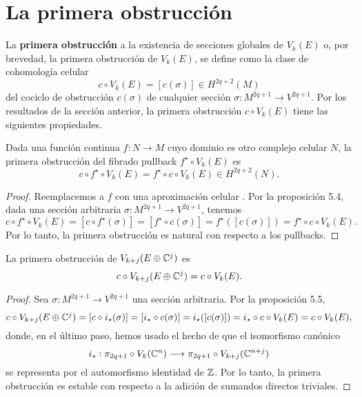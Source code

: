 \section{La primera obstrucción}

La \textbf{primera obstrucción} a la existencia de secciones globales de $V_k(E)$ o, por brevedad, la primera obstrucción de $V_k(E)$, se define como la clase de cohomología celular
$$c \circ V_k(E) = [c(\sigma)] \in H^{2q+2}(M)$$
del cociclo de obstrucción $c(\sigma)$ de cualquier sección $\sigma : M^{2q+1} \to V^{2q+1}$. Por los resultados de la sección anterior, la primera obstrucción $c \circ V_k(E)$ tiene las siguientes propiedades.

\begin{proposition}[Naturalidad]
Dada una función continua $f : N \to M$ cuyo dominio es otro complejo celular $N$, la primera obstrucción del fibrado pullback $f^\star \circ V_k(E)$ es
$$c \circ f^\star \circ V_k(E) = f^\star \circ c \circ V_k(E) \in H^{2q+2}(N).$$
\end{proposition}

\begin{proof}
Reemplacemos a $f$ con una aproximación celular \cite[p. 349]{hatcher1}. Por la proposición 5.4, dada una sección arbitraria $\sigma : M^{2q+1} \to V^{2q+1}$, tenemos
$$
c \circ f^\star \circ V_k(E)
    = [c \circ f^\star(\sigma)]
    = [f^\star \circ c(\sigma)]
    = f^\star([c(\sigma)])
    = f^\star \circ c \circ V_k(E).
$$
Por lo tanto, la primera obstrucción es natural con respecto a los pullbacks.
\end{proof}

\begin{proposition}[Estabilidad]
La primera obstrucción de $V_{k+j}(E \oplus \mathbb C^j)$ es
$$c \circ V_{k+j}(E \oplus \mathbb C^j) = c \circ V_k(E).$$
\end{proposition}

\begin{proof}
Sea $\sigma : M^{2q+1} \to V^{2q+1}$ una sección arbitraria. Por la proposición 5.5,
$$
c \circ V_{k+j}(E \oplus \mathbb C^j)
    = [c \circ i_\star(\sigma)]
    = [i_\star \circ c(\sigma)]
    = i_\star([c(\sigma)])
    = i_\star \circ c \circ V_k(E)
    = c \circ V_k(E),
$$
donde, en el último paso, hemos usado el hecho de que el isomorfismo canónico
$$i_\star : \pi_{2q+1} \circ V_k(\mathbb C^n) \longrightarrow \pi_{2q+1} \circ V_{k+j}(\mathbb C^{n+j})$$
se representa por el automorfismo identidad de $\mathbb Z$. Por lo tanto, la primera obstrucción es estable con respecto a la adición de sumandos directos triviales.
\end{proof}

